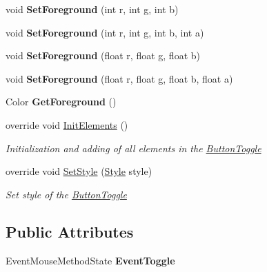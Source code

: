 \begin{DoxyCompactItemize}
\mbox{\label{class_space_v_i_l_1_1_button_toggle_acbe7c5a48745ee961ec69cc8b9ed1fac}} 
void {\bfseries Set\+Foreground} (int r, int g, int b)
\item 
\mbox{\label{class_space_v_i_l_1_1_button_toggle_a734ebe430259a68d7a6ec1757d28e6de}} 
void {\bfseries Set\+Foreground} (int r, int g, int b, int a)
\item 
\mbox{\label{class_space_v_i_l_1_1_button_toggle_acddc6b624b12c5ea3cd2bb2970eda391}} 
void {\bfseries Set\+Foreground} (float r, float g, float b)
\item 
\mbox{\label{class_space_v_i_l_1_1_button_toggle_ab725dbd06795c980e9765c2a2d2ca1b3}} 
void {\bfseries Set\+Foreground} (float r, float g, float b, float a)
\item 
\mbox{\label{class_space_v_i_l_1_1_button_toggle_a5e2723658f35d5d0777d3dc082f5256e}} 
Color {\bfseries Get\+Foreground} ()
\item 
override void \mbox{\hyperlink{class_space_v_i_l_1_1_button_toggle_a5e2e938da7e38f0a6378fee26af5a75b}{Init\+Elements}} ()
\begin{DoxyCompactList}\small\item\em Initialization and adding of all elements in the \mbox{\hyperlink{class_space_v_i_l_1_1_button_toggle}{Button\+Toggle}} \end{DoxyCompactList}\item 
override void \mbox{\hyperlink{class_space_v_i_l_1_1_button_toggle_a8a6aed829ff23f94bc21734471f8edc9}{Set\+Style}} (\mbox{\hyperlink{class_space_v_i_l_1_1_decorations_1_1_style}{Style}} style)
\begin{DoxyCompactList}\small\item\em Set style of the \mbox{\hyperlink{class_space_v_i_l_1_1_button_toggle}{Button\+Toggle}} \end{DoxyCompactList}\end{DoxyCompactItemize}
\subsection*{Public Attributes}
\begin{DoxyCompactItemize}
\item 
\mbox{\label{class_space_v_i_l_1_1_button_toggle_a0c392efaeed75f29a9a75d2a36294b62}} 
Event\+Mouse\+Method\+State {\bfseries Event\+Toggle}
\end{DoxyCompactItemize}
